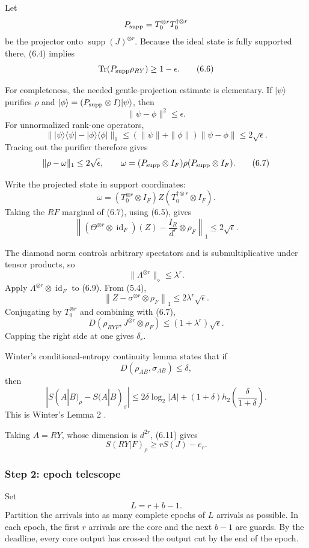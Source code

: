 \documentclass[11pt,a4paper]{article}
\numberwithin{equation}{section}
\begin{document}
Let \[
P_{\rm supp}=T_0^{\otimes r}T_0^{\dagger\otimes r}
\] be the projector onto \(\operatorname{supp}(J)^{\otimes r}\). Because
the ideal state is fully supported there, (6.4) implies \[
\operatorname{Tr}(P_{\rm supp}\rho_{RY})\ge1-\epsilon.
\tag{6.6}
\]

For completeness, the needed gentle-projection estimate is elementary.
If \(|\psi\rangle\) purifies \(\rho\) and
\(|\phi\rangle=(P_{\rm supp}\otimes I)|\psi\rangle\), then \[
\|\psi-\phi\|^2\le\epsilon.
\] For unnormalized rank-one operators, \[
\bigl\|
|\psi\rangle\langle\psi|
-
|\phi\rangle\langle\phi|
\bigr\|_1
\le
(\|\psi\|+\|\phi\|)\|\psi-\phi\|
\le2\sqrt\epsilon.
\] Tracing out the purifier therefore gives \[
\|\rho-\omega\|_1\le2\sqrt\epsilon,
\qquad
\omega=(P_{\rm supp}\otimes I_F)\rho(P_{\rm supp}\otimes I_F).
\tag{6.7}
\]

Write the projected state in support coordinates: \[
\omega
=
(T_0^{\otimes r}\otimes I_F)
Z
(T_0^{\dagger\otimes r}\otimes I_F).
\tag{6.8}
\] Taking the \(RF\) marginal of (6.7), using (6.5), gives \[
\left\|
(\Theta^{\otimes r}\otimes\operatorname{id}_F)(Z)
-
\frac{I_R}{d^r}\otimes\rho_F
\right\|_1
\le2\sqrt\epsilon.
\tag{6.9}
\]

The diamond norm controls arbitrary spectators and is submultiplicative
under tensor products, so \[
\|\Lambda^{\otimes r}\|_\diamond
\le\lambda^r.
\] Apply \(\Lambda^{\otimes r}\otimes\operatorname{id}_F\) to (6.9).
From (5.4), \[
\left\|
Z-\sigma^{\otimes r}\otimes\rho_F
\right\|_1
\le2\lambda^r\sqrt\epsilon.
\tag{6.10}
\] Conjugating by \(T_0^{\otimes r}\) and combining with (6.7), \[
D\!\left(
\rho_{RYF},
J^{\otimes r}\otimes\rho_F
\right)
\le
(1+\lambda^r)\sqrt\epsilon.
\tag{6.11}
\] Capping the right side at one gives \(\delta_r\).

Winter's conditional-entropy continuity lemma states that if \[
D(\rho_{AB},\sigma_{AB})\le\delta,
\] then \[
|S(A|B)_\rho-S(A|B)_\sigma|
\le
2\delta\log_2|A|
+
(1+\delta)
h_2\!\left(
\frac{\delta}{1+\delta}
\right).
\] This is Winter's Lemma 2 \citep{winter2016}.

Taking \(A=RY\), whose dimension is \(d^{2r}\), (6.11) gives \[
S(RY|F)_\rho
\ge
rS(J)-e_r.
\tag{6.12}
\]

\subsubsection{Step 2: epoch telescope}\label{step-2-epoch-telescope}

Set \[
L=r+b-1.
\] Partition the arrivals into as many complete epochs of \(L\) arrivals
as possible. In each epoch, the first \(r\) arrivals are the core and
the next \(b-1\) are guards. By the deadline, every core output has
crossed the output cut by the end of the epoch.
\end{document}
